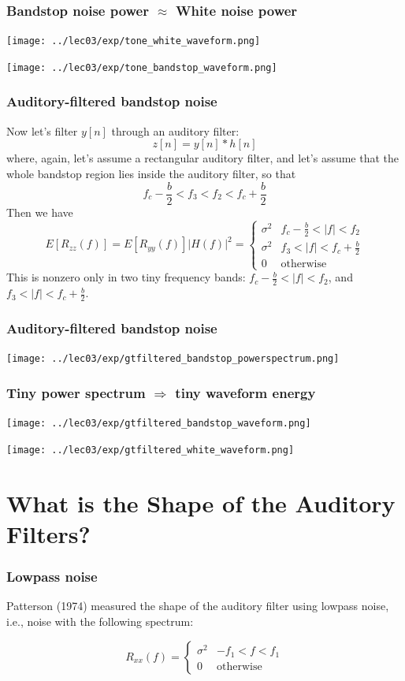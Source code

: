 \begin{frame}
  \frametitle{Bandstop noise power $\approx$ White noise power}

  \centerline{\texttt{[image: ../lec03/exp/tone\_white\_waveform.png]}}
  \centerline{\texttt{[image: ../lec03/exp/tone\_bandstop\_waveform.png]}}
\end{frame}

\begin{frame}
  \frametitle{Auditory-filtered bandstop noise}

  Now let's filter $y[n]$ through an auditory filter:
  \[
  z[n] = y[n]\ast h[n]
  \]
  where, again, let's assume a rectangular auditory filter, and let's assume that the
  whole bandstop region lies inside the auditory filter, so that
  \[
  f_c-\frac{b}{2} < f_3 < f_2 < f_c+\frac{b}{2}
  \]
  Then we have
  \[
  E\left[R_{zz}(f)\right] = E\left[R_{yy}(f)\right]|H(f)|^2 = \begin{cases}
    \sigma^2 & f_c-\frac{b}{2} < |f| < f_2\\
    \sigma^2 & f_3 < |f| < f_c+\frac{b}{2} \\
    0 & \mbox{otherwise}
  \end{cases}
  \]
  This is nonzero only in two tiny frequency bands:  $f_c-\frac{b}{2} < |f| < f_2$, and
  $f_3 < |f| < f_c+\frac{b}{2}$.
\end{frame}

\begin{frame}
  \frametitle{Auditory-filtered bandstop noise}

  \centerline{\texttt{[image: ../lec03/exp/gtfiltered\_bandstop\_powerspectrum.png]}}
\end{frame}

\begin{frame}
  \frametitle{Tiny power spectrum $\Rightarrow$ tiny waveform energy}

  \centerline{\texttt{[image: ../lec03/exp/gtfiltered\_bandstop\_waveform.png]}}
  \centerline{\texttt{[image: ../lec03/exp/gtfiltered\_white\_waveform.png]}}
\end{frame}

\section[Shape]{What is the Shape of the Auditory Filters?}
\setcounter{subsection}{1}

\begin{frame}
  \frametitle{Lowpass noise}

  Patterson (1974) measured the shape of the auditory filter using
  lowpass noise, i.e., noise with the following spectrum:

  \[
  R_{xx}(f)  =\begin{cases}
  \sigma^2 & -f_1 < f<f_1\\ 0&\mbox{otherwise}
  \end{cases}
  \]
\end{frame}
  
